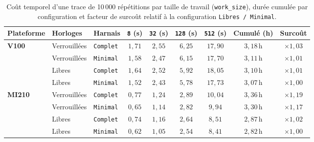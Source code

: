 \begin{table}[htb]
    \centering
    \small
    \caption{Coût temporel d'une trace de 10\,000 répétitions par taille de travail (\texttt{work\_size}), durée cumulée par configuration et facteur de surcoût relatif à la configuration \texttt{Libres / Minimal}.}
    \label{tab:rq2_cout_temporel}
    \renewcommand{\arraystretch}{1.25}
    \begin{tabular}{lllcccccc}
        \toprule
        \textbf{Plateforme} & \textbf{Horloges} & \textbf{Harnais} & 
        \textbf{\texttt{8} (s)} & \textbf{\texttt{32} (s)} & 
        \textbf{\texttt{128} (s)} & \textbf{\texttt{512} (s)} & 
        \textbf{Cumulé (h)} & \textbf{Surcoût} \\
        \midrule
        \multirow{4}{*}{\textbf{V100}} 
        & Verrouillées & \texttt{Complet}  & $1{,}71$ & $2{,}55$ & $6{,}25$ & $17{,}90$ & $3{,}18\,\text{h}$ & $\times 1{,}03$ \\
        & Verrouillées & \texttt{Minimal}  & $1{,}58$ & $2{,}47$ & $6{,}15$ & $17{,}70$ & $3{,}11\,\text{h}$ & $\times 1{,}01$ \\
        & Libres       & \texttt{Complet}  & $1{,}64$ & $2{,}52$ & $5{,}92$ & $18{,}05$ & $3{,}10\,\text{h}$ & $\times 1{,}01$ \\
        & Libres       & \texttt{Minimal}  & $1{,}52$ & $2{,}43$ & $5{,}78$ & $17{,}73$ & $3{,}07\,\text{h}$ & $\times 1{,}00$ \\
        \midrule
        \multirow{4}{*}{\textbf{MI210}} 
        & Verrouillées & \texttt{Complet}  & $0{,}77$ & $1{,}24$ & $2{,}89$ & $10{,}04$ & $3{,}36\,\text{h}$ & $\times 1{,}19$ \\
        & Verrouillées & \texttt{Minimal}  & $0{,}65$ & $1{,}14$ & $2{,}82$ & $9{,}94$ & $3{,}30\,\text{h}$ & $\times 1{,}17$ \\
        & Libres       & \texttt{Complet}  & $0{,}74$ & $1{,}16$ & $2{,}64$ & $8{,}51$ & $2{,}87\,\text{h}$ & $\times 1{,}02$ \\
        & Libres       & \texttt{Minimal}  & $0{,}62$ & $1{,}05$ & $2{,}54$ & $8{,}41$ & $2{,}82\,\text{h}$ & $\times 1{,}00$ \\
        \bottomrule
    \end{tabular}
    \vspace{0.15cm}
\end{table}
